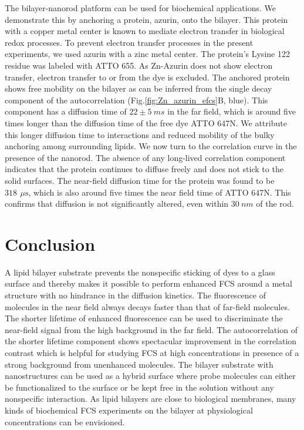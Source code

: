 \documentclass[journal=jpccck,manuscript=article]{achemso}
\newcommand{\us}{\ensuremath{\,\mu\textrm{s}}}
\begin{document}
The bilayer-nanorod platform can be used for biochemical applications. We demonstrate this by anchoring a protein, azurin, onto the bilayer. This protein with a copper metal center is known to mediate electron transfer in biological redox processes.\cite{kolczak2006azurin,Vijgenboom1997invivo} To prevent electron transfer processes in the present experiments, we used azurin with a zinc metal center. The protein's Lysine 122 residue was labeled with ATTO 655. As Zn-Azurin does not show electron transfer, electron transfer to or from the dye is excluded. The anchored protein shows free mobility on the bilayer as can be inferred from the single decay component of the autocorrelation (Fig.\ref{fig:Zn_azurin_efcs}B, blue). This component has a diffusion time of $22\pm5~ms$ in the far field, which is around five times longer than the diffusion time of the free dye ATTO 647N. We attribute this longer diffusion time to interactions and reduced mobility of the bulky anchoring among surrounding lipids. We now turn to the correlation curve in the presence of the nanorod. The absence of any long-lived correlation component indicates that the protein continues to diffuse freely and does not stick to the solid surfaces. The near-field diffusion time for the protein was found to be $318~\us$, which is also around five times the near field time of ATTO 647N. This confirms that diffusion is not significantly altered, even within $30~nm$ of the rod.\\
\section{Conclusion}
A lipid bilayer substrate prevents the nonspecific sticking of dyes to a glass surface and thereby makes it possible to perform enhanced FCS around a metal structure with no hindrance in the diffusion kinetics. The fluorescence of molecules in the near field always decays faster than that of far-field molecules. The shorter lifetime of enhanced fluorescence can be used to discriminate the near-field signal from the high background in the far field. The autocorrelation of the shorter lifetime component shows spectacular improvement in the correlation contrast which is helpful for studying FCS at high concentrations in presence of a strong background from unenhanced molecules. The bilayer substrate with nanostructures can be used as a hybrid surface where probe molecules can either be functionalized to the surface or be kept free in the solution without any nonspecific interaction. As lipid bilayers are close to biological membranes, many kinds of biochemical FCS experiments on the bilayer at physiological concentrations can be envisioned.\\
\end{document}
